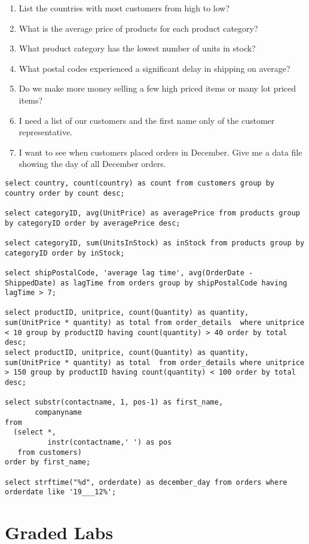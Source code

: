\documentclass{article}
\begin{document}
    \begin{enumerate}
\item List the countries with most customers from high to low?
\item What is the average price of products for each product category?
\item What product category has the lowest number of units in stock?
\item What postal codes experienced a significant delay in shipping on average?
\item Do we make more money selling a few high priced items or many lot priced items?
\item I need a list of our customers and the first name only of the customer representative.
\item I want to see when customers placed orders in December. Give me a data file showing the day of all December orders.
    
    \end{enumerate}

    \begin{lstlisting}
select country, count(country) as count from customers group by country order by count desc;

select categoryID, avg(UnitPrice) as averagePrice from products group by categoryID order by averagePrice desc; 

select categoryID, sum(UnitsInStock) as inStock from products group by categoryID order by inStock;

select shipPostalCode, 'average lag time', avg(OrderDate - ShippedDate) as lagTime from orders group by shipPostalCode having lagTime > 7;

select productID, unitprice, count(Quantity) as quantity, sum(UnitPrice * quantity) as total from order_details  where unitprice < 10 group by productID having count(quantity) > 40 order by total desc;
select productID, unitprice, count(Quantity) as quantity, sum(UnitPrice * quantity) as total  from order_details where unitprice > 150 group by productID having count(quantity) < 100 order by total desc;

select substr(contactname, 1, pos-1) as first_name,
       companyname
from
  (select *,
          instr(contactname,' ') as pos
   from customers)
order by first_name;

select strftime("%d", orderdate) as december_day from orders where orderdate like '19___12%';
    \end{lstlisting}


    \section{Graded Labs}
\end{document}
